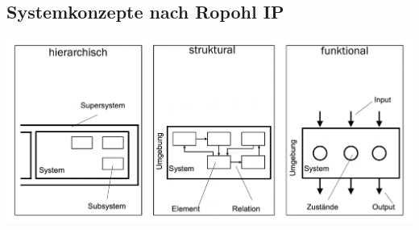 \subsection{Systemkonzepte nach Ropohl \hfill IP}
\begin{footnotesize}
    \begin{center}
        \includegraphics[width = 1.0\linewidth]{src/images/MAEIP_Ropohl}
    \end{center}
\end{footnotesize}